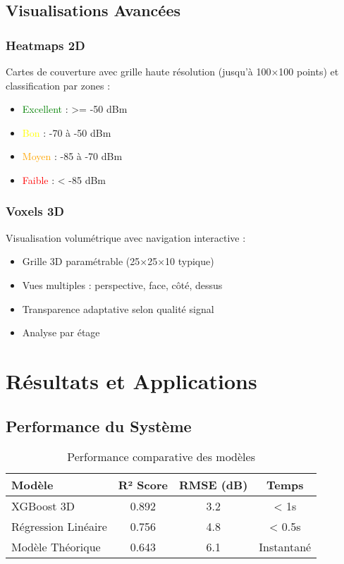 \documentclass[12pt,a4paper]{article}
\begin{document}
\subsection{Visualisations Avancées}

\subsubsection{Heatmaps 2D}
Cartes de couverture avec grille haute résolution (jusqu'à 100×100 points) et classification par zones :
\begin{itemize}
    \item \textcolor{green}{Excellent} : >= -50 dBm
    \item \textcolor{yellow}{Bon} : -70 à -50 dBm  
    \item \textcolor{orange}{Moyen} : -85 à -70 dBm
    \item \textcolor{red}{Faible} : < -85 dBm
\end{itemize}

\subsubsection{Voxels 3D}
Visualisation volumétrique avec navigation interactive :
\begin{itemize}
    \item Grille 3D paramétrable (25×25×10 typique)
    \item Vues multiples : perspective, face, côté, dessus
    \item Transparence adaptative selon qualité signal
    \item Analyse par étage
\end{itemize}

\section{Résultats et Applications}

\subsection{Performance du Système}

\begin{table}[H]
\centering
\begin{tabular}{|l|c|c|c|}
\hline
\textbf{Modèle} & \textbf{R² Score} & \textbf{RMSE (dB)} & \textbf{Temps} \\
\hline
XGBoost 3D & 0.892 & 3.2 & < 1s \\
Régression Linéaire & 0.756 & 4.8 & < 0.5s \\
Modèle Théorique & 0.643 & 6.1 & Instantané \\
\hline
\end{tabular}
\caption{Performance comparative des modèles}
\end{table}
\end{document}

